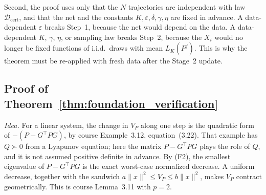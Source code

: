 Second, the proof uses only that the $N$ trajectories are independent with
law $\mathcal D_{\mathrm{cert}}$, and that the net and the constants
$K,\varepsilon,\delta,\gamma,\eta$ are fixed in advance. A data-dependent
$\varepsilon$ breaks Step~1, because the net would depend on the data. A
data-dependent $K$, $\gamma$, $\eta$, or sampling law breaks Step~2,
because the $X_i$ would no longer be fixed functions of i.i.d.\ draws with
mean $L_K(P^j)$. This is why the theorem must be re-applied with fresh data
after the Stage~2 update.

\subsection{Proof of Theorem~\ref{thm:foundation_verification}}
\label{subsec:proof_verification}

\emph{Idea.} For a linear system, the change in $V_P$ along one step is the
quadratic form of $-(P-G^\top PG)$, by course Example~3.12,
equation~(3.22). That example has $Q\succ0$ from a Lyapunov equation; here
the matrix $P-G^\top PG$ plays the role of $Q$, and it is not assumed
positive definite in advance. By (F2), the smallest eigenvalue of
$P-G^\top PG$ is the exact worst-case normalized decrease. A uniform decrease, together with the
sandwich $a\|x\|^2\le V_P\le b\|x\|^2$, makes $V_P$ contract geometrically.
This is course Lemma~3.11 with $p=2$.

